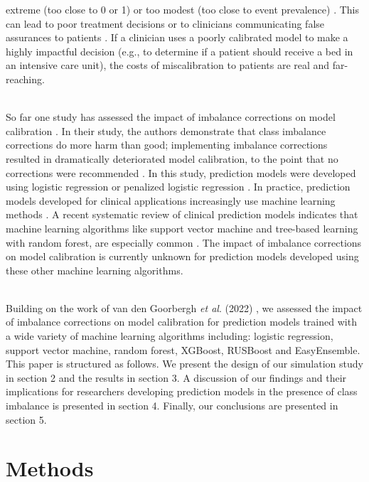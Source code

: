 \documentclass[AMA,STIX1COL,]{WileyNJD-v2}
\begin{document}
extreme (too close to 0 or 1) or too modest (too close to event
prevalence) \citep{achilles}. This can lead to poor treatment decisions
or to clinicians communicating false assurances to patients
\citep{achilles, 12days, bens_paper}. If a clinician uses a poorly
calibrated model to make a highly impactful decision (e.g., to determine
if a patient should receive a bed in an intensive care unit), the costs
of miscalibration to patients are real and far-reaching.\\
\strut \\
So far one study has assessed the impact of imbalance corrections on
model calibration \citep{ruben}. In their study, the authors demonstrate
that class imbalance corrections do more harm than good; implementing
imbalance corrections resulted in dramatically deteriorated model
calibration, to the point that no corrections were recommended
\citep{ruben}. In this study, prediction models were developed using
logistic regression or penalized logistic regression \citep{ruben}. In
practice, prediction models developed for clinical applications
increasingly use machine learning methods \citep{constanza}. A recent
systematic review of clinical prediction models indicates that machine
learning algorithms like support vector machine and tree-based learning
with random forest, are especially common \citep{constanza}. The impact
of imbalance corrections on model calibration is currently unknown for
prediction models developed using these other machine learning
algorithms.\\
\strut \\
Building on the work of van den Goorbergh \emph{et al}. (2022)
\citep{ruben}, we assessed the impact of imbalance corrections on model
calibration for prediction models trained with a wide variety of machine
learning algorithms including: logistic regression, support vector
machine, random forest, XGBoost, RUSBoost and EasyEnsemble. This paper
is structured as follows. We present the design of our simulation study
in section 2 and the results in section 3. A discussion of our findings
and their implications for researchers developing prediction models in
the presence of class imbalance is presented in section 4. Finally, our
conclusions are presented in section 5.

\hypertarget{methods}{%
\section{Methods}\label{methods}}
\end{document}
